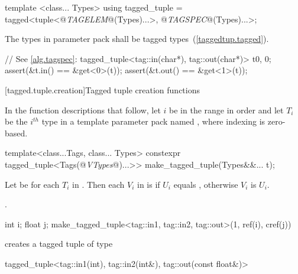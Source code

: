{\begin{codeblock}
template <class... Types>
using tagged_tuple = tagged<tuple<@\textit{TAGELEM}@(Types)...>,
                            @\textit{TAGSPEC}@(Types)...>;
\end{codeblock}

\pnum The types in parameter pack  shall be tagged types~(\ref{taggedtup.tagged}).

\pnum \enterexample
\begin{codeblock}
// See \ref{alg.tagspec}:
tagged_tuple<tag::in(char*), tag::out(char*)> t{0, 0};
assert(&t.in() == &get<0>(t));
assert(&t.out() == &get<1>(t));
\end{codeblock}
\exitexample

[tagged.tuple.creation]{Tagged tuple creation functions}

\pnum
In the function descriptions that follow, let $i$ be in the range 
in order and let $T_i$ be the $i^{th}$ type in a template parameter pack named ,
where indexing is zero-based.

%
%
\begin{itemdecl}
template<class...Tags, class... Types>
  constexpr tagged_tuple<Tags(@\textit{VTypes}@)...>> make_tagged_tuple(Types&&... t);
\end{itemdecl}

\begin{itemdescr} \pnum Let  be  for each
$T_i$ in . Then each $V_i$ in  is
 if $U_i$ equals , otherwise
$V_i$ is $U_i$.

\pnum
\returns {}.

\pnum
\enterexample

\begin{codeblock}
int i; float j;
make_tagged_tuple<tag::in1, tag::in2, tag::out>(1, ref(i), cref(j))
\end{codeblock}

creates a tagged tuple of type

\begin{codeblock}
tagged_tuple<tag::in1(int), tag::in2(int&), tag::out(const float&)>
\end{codeblock}
\exitexample
\end{itemdescr}
}
